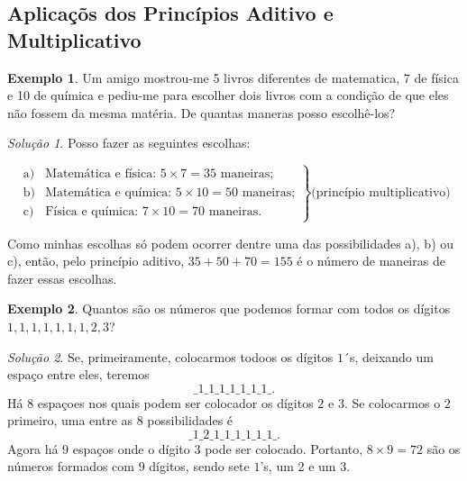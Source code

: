 \documentclass[]{book}
\theoremstyle{definition}
\theoremstyle{definition}
\newtheorem{example}{Exemplo}[chapter]
\theoremstyle{definition}
\theoremstyle{remark}
\newtheorem*{solution}{Solução}
\begin{document}
\hypertarget{aplicauxe7uxf5s-dos-princuxedpios-aditivo-e-multiplicativo}{%
\subsection{Aplicaçõs dos Princípios Aditivo e Multiplicativo}\label{aplicauxe7uxf5s-dos-princuxedpios-aditivo-e-multiplicativo}}

\begin{example}
\protect\hypertarget{exm:unnamed-chunk-20}{}{\label{exm:unnamed-chunk-20} }Um amigo mostrou-me 5 livros diferentes de matematica, 7 de física e 10 de química e pediu-me para escolher dois livros com a condição de que eles não fossem da mesma matéria. De quantas maneras posso escolhê-los?
\end{example}

\begin{solution}
\iffalse{} {Solução. } \fi{}Posso fazer as seguintes escolhas:

\[ \left.\begin{array}{ll}
\text{a)}& \text{Matemática e física: } 5 \times 7 = 35 \text{ maneiras;} \\ 
\text{b)}& \text{Matemática e química: } 5 \times 10 = 50 \text{ maneiras;} \\ 
\text{c)}& \text{Física e química: } 7 \times 10 = 70 \text{ maneiras.}
\end{array}\right\} \text{(princípio multiplicativo)}
\]

Como minhas escolhas só podem ocorrer dentre uma das possibilidades a), b) ou c), então, pelo princípio aditivo, \(35 + 50 + 70 = 155\) é o número de maneiras de fazer essas escolhas.
\end{solution}

\begin{example}
\protect\hypertarget{exm:unnamed-chunk-22}{}{\label{exm:unnamed-chunk-22} }Quantos são os números que podemos formar com todos os dígitos \(1, 1, 1, 1, 1, 1, 1, 2, 3\)?
\end{example}

\begin{solution}
\iffalse{} {Solução. } \fi{}Se, primeiramente, colocarmos todoos os dígitos \(1\)´s, deixando um espaço entre eles, teremos
\[\_1\_1\_1\_1\_1\_1\_1\_.\]
Há \(8\) espaçoes nos quais podem ser colocador os dígitos \(2\) e \(3\).
Se colocarmos o \(2\) primeiro, uma entre as 8 possibilidades é
\[\_1\_2\_1\_1\_1\_1\_1\_1\_.\]
Agora há \(9\) espaços onde o dígito \(3\) pode ser colocado.
Portanto, \(8 \times 9 = 72\) são os números formados com 9 dígitos, sendo sete \(1\)'s, um 2 e um 3.
\end{solution}
\end{document}
